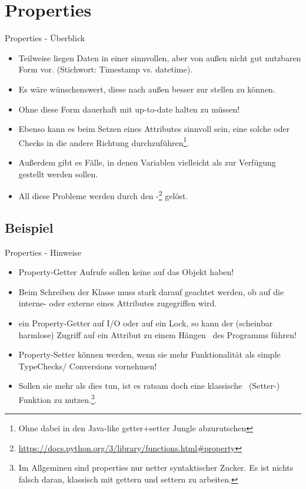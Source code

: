 \documentclass[12pt, aspectratio=169, usepdftitle=false]{beamer}
\newcommand{\pp}[1]{\lpl{#1}}
\newcommand{\furl}[1]{\footnote{\url{#1}}}
\begin{document}
\framecardfragen

\section{Properties}

\begin{frame}{Properties - Überblick}
	\begin{itemize}
		\item Teilweise liegen Daten in einer  sinnvollen, aber von außen nicht gut nutzbaren Form vor. (Stichwort: Timestamp vs. datetime).
		\pause
		\item[] Es wäre wünschenswert, diese nach außen besser zur  stellen zu können.
		\item[] Ohne diese Form dauerhaft mit up-to-date halten zu müssen!
		\pause
		\item Ebenso kann es beim Setzen eines Attributes sinnvoll sein, eine solche  oder Checks in die andere Richtung durchzuführen\footnote{Ohne dabei in den Java-like getter+setter Jungle abzurutschen}.
		\pause
		\item Außerdem gibt es Fälle, in denen Variablen vielleicht als  zur Verfügung gestellt werden sollen.
		\pause
		\item All diese Probleme werden durch den \pp{@property}-\furl{https://docs.python.org/3/library/functions.html\#property} gelöst.
	\end{itemize}
\end{frame}

\subsection{Beispiel}


\begin{frame}{Properties - Hinweise}
	\begin{itemize}
		\item Property-Getter Aufrufe sollen keine  auf das Objekt haben!
		\pause
		\item Beim Schreiben der Klasse muss stark darauf geachtet werden, ob auf die interne- oder externe  eines Attributes zugegriffen wird.
		\pause
		\item {} ein Property-Getter auf I/O oder auf ein Lock, so kann der (scheinbar harmlose) Zugriff auf ein Attribut zu einem \glqq Hängen\grqq~ des Programms führen!
		\pause
		\item Property-Setter können  werden, wenn sie mehr Funktionalität als simple TypeChecks/ Conversions vornehmen!
		\item[] Sollen sie mehr als dies tun, ist es ratsam doch eine \glqq klassische\grqq~ (Setter-) Funktion zu nutzen.\footnote{Im Allgeminen sind properties nur netter syntaktischer Zucker. Es ist nichts falsch daran, klassisch mit gettern und settern zu arbeiten.}.
	\end{itemize}
\end{frame}
\end{document}
